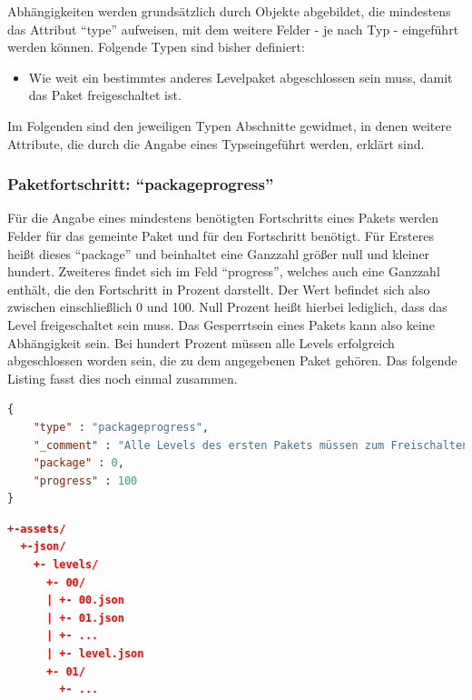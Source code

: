 Abhängigkeiten werden grundsätzlich durch Objekte abgebildet, die mindestens das Attribut "`type"' aufweisen, mit dem weitere Felder - je nach Typ - eingeführt werden können.
Folgende Typen sind bisher definiert:
\begin{itemize}
	\item[packageprogress:] Wie weit ein bestimmtes anderes Levelpaket abgeschlossen sein muss, damit das Paket freigeschaltet ist.
\end{itemize}
Im Folgenden sind den jeweiligen Typen Abschnitte gewidmet, in denen weitere Attribute, die durch die Angabe eines Typseingeführt werden, erklärt sind.

\subsubsection{Paketfortschritt: "`packageprogress"'}
Für die Angabe eines mindestens benötigten Fortschritts eines Pakets werden Felder für das gemeinte Paket und für den Fortschritt benötigt.
Für Ersteres heißt dieses "`package"' und beinhaltet eine Ganzzahl größer null und kleiner hundert.
Zweiteres findet sich im Feld "`progress"', welches auch eine Ganzzahl enthält, die den Fortschritt in Prozent darstellt.
Der Wert befindet sich also zwischen einschließlich 0 und 100.
Null Prozent heißt hierbei lediglich, dass das Level freigeschaltet sein muss. 
Das Gesperrtsein eines Pakets kann also keine Abhängigkeit sein.
Bei hundert Prozent müssen alle Levels erfolgreich abgeschlossen worden sein, die zu dem angegebenen Paket gehören.
Das folgende Listing fasst dies noch einmal zusammen.
\begin{lstlisting}[language=json,caption={Besipielhafte Definition einer Abhängigkeit vom Typ "`boxprogress"'}]
{
	"type" : "packageprogress",
	"_comment" : "Alle Levels des ersten Pakets müssen zum Freischalten erfolgreich abgeschlossen worden sein",
	"package" : 0,
	"progress" : 100
}
\end{lstlisting}

\begin{lstlisting}[language=json,caption={Ordnerübersicht zur Levelspezifikation}]
+-assets/
  +-json/
    +- levels/
      +- 00/
      | +- 00.json
      | +- 01.json
      | +- ...
      | +- level.json
      +- 01/
        +- ...
\end{lstlisting}

